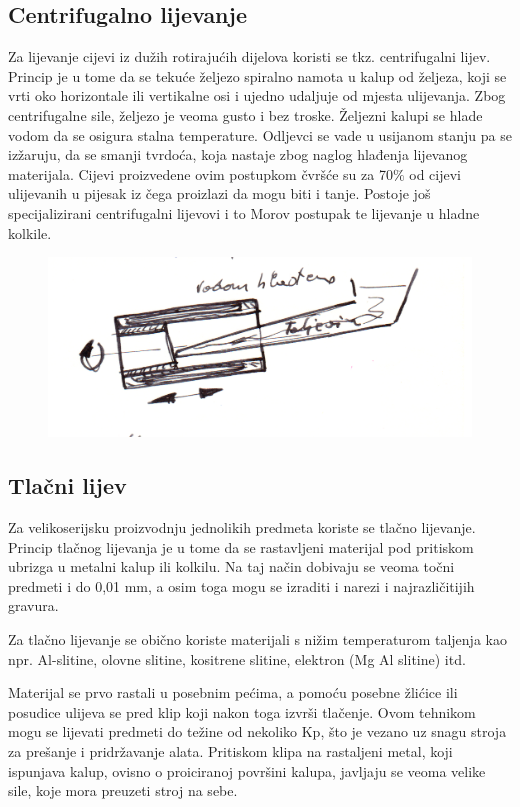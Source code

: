 \documentclass[a4paper,12pt]{article}
\numberwithin{figure}{section}
\begin{document}
\subsection{Centrifugalno lijevanje}
Za lijevanje cijevi iz dužih rotirajućih dijelova koristi se tkz. centrifugalni lijev. Princip je u tome da se tekuće željezo spiralno namota u kalup od željeza, koji se vrti oko horizontale ili vertikalne osi i ujedno udaljuje od mjesta ulijevanja. Zbog centrifugalne sile, željezo je veoma gusto i bez troske. Željezni kalupi se hlade vodom da se osigura stalna temperature. Odljevci se vade u usijanom stanju pa se izžaruju, da se smanji tvrdoća, koja nastaje zbog naglog hlađenja lijevanog materijala. Cijevi proizvedene ovim postupkom čvršće su za 70$\%$ od cijevi ulijevanih u pijesak iz čega proizlazi da mogu biti i tanje. Postoje još specijalizirani centrifugalni lijevovi i to Morov postupak te lijevanje u hladne kolkile.
\begin{figure}[!h]
\centering
\includegraphics[scale=0.17]{image_60-2.png}
\end{figure}
\FloatBarrier
\subsection{Tlačni lijev}
Za velikoserijsku proizvodnju jednolikih predmeta koriste se tlačno lijevanje. Princip tlačnog lijevanja je u tome da se rastavljeni materijal pod pritiskom ubrizga u metalni kalup ili kolkilu. Na taj način dobivaju se veoma točni predmeti  i do 0,01 mm, a osim toga mogu se izraditi i narezi i najrazličitijih gravura. \par 
Za tlačno lijevanje se obično koriste materijali s nižim temperaturom taljenja kao npr. Al-slitine, olovne slitine, kositrene slitine, elektron (Mg Al slitine) itd.\par 
Materijal se prvo rastali u posebnim pećima, a pomoću posebne žlićice ili posudice ulijeva se pred klip koji nakon toga izvrši tlačenje. Ovom tehnikom mogu se lijevati predmeti do težine od nekoliko Kp, što je vezano uz snagu stroja za prešanje i pridržavanje alata. Pritiskom klipa na rastaljeni metal, koji ispunjava kalup, ovisno o proiciranoj površini kalupa, javljaju se veoma velike sile, koje mora preuzeti stroj na sebe.
\end{document}
